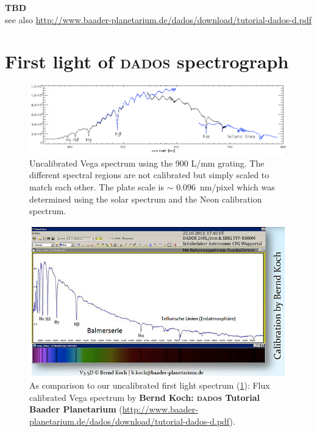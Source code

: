 \documentclass[a4paper, 11pt, fleqn]{memoir}
\begin{document}
\textbf{ TBD\\ } see also \url{http://www.baader-planetarium.de/dados/download/tutorial-dados-d.pdf}

\section{First light of \textsc{dados} spectrograph}\label{dados first light}

\begin{figure}[H] \centering \includegraphics[width=12cm]{vega_spectrum_uncalibrated} \caption{Uncalibrated Vega spectrum using the 900 L/mm grating.
        \newline The different spectral regions are not calibrated but simply scaled to match each other.
        The plate scale is $\sim$ 0.096~nm/pixel which was determined using the solar spectrum and the Neon calibration spectrum.
    }
    \label{vega uncalibrated}
\end{figure}

\begin{figure}[H]
    \centering
    \includegraphics[width=12cm]{vega_koch}
    \caption{As comparison to our uncalibrated first light spectrum (\cref{vega uncalibrated}): \newline Flux calibrated Vega spectrum by \textbf{Bernd Koch: \textsc{dados}
            Tutorial Baader Planetarium} (\url{http://www.baader-planetarium.de/dados/download/tutorial-dados-d.pdf}).
    }
    \label{vega calibrated}
\end{figure}
\end{document}
